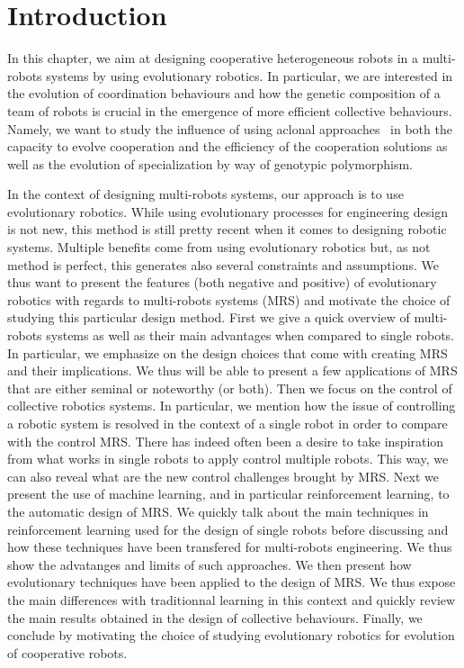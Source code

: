 \section{Introduction}

  In this chapter, we aim at designing cooperative heterogeneous robots in a multi-robots systems by using evolutionary robotics. In particular, we are interested in the evolution of coordination behaviours and how the genetic composition of a team of robots is crucial in the emergence of more efficient collective behaviours. Namely, we want to study the influence of using aclonal approaches~\parencite{Quinn2001} in both the capacity to evolve cooperation and the efficiency of the cooperation solutions as well as the evolution of specialization by way of genotypic polymorphism.

  In the context of designing multi-robots systems, our approach is to use evolutionary robotics. While using evolutionary processes for engineering design is not new, this method is still pretty recent when it comes to designing robotic systems. Multiple benefits come from using evolutionary robotics but, as not method is perfect, this generates also several constraints and assumptions. We thus want to present the features (both negative and positive) of evolutionary robotics with regards to multi-robots systems (MRS) and motivate the choice of studying this particular design method. First we give a quick overview of multi-robots systems as well as their main advantages when compared to single robots. In particular, we emphasize on the design choices that come with creating MRS and their implications. We thus will be able to present a few applications of MRS that are either seminal or noteworthy (or both). Then we focus on the control of collective robotics systems. In particular, we mention how the issue of controlling a robotic system is resolved in the context of a single robot in order to compare with the control MRS. There has indeed often been a desire to take inspiration from what works in single robots to apply control multiple robots. This way, we can also reveal what are the new control challenges brought by MRS. Next we present the use of machine learning, and in particular reinforcement learning, to the automatic design of MRS. We quickly talk about the main techniques in reinforcement learning used for the design of single robots before discussing and how these techniques have been transfered for multi-robots engineering. We thus show the advatanges and limits of such approaches. We then present how evolutionary techniques have been applied to the design of MRS. We thus expose the main differences with traditionnal learning in this context and quickly review the main results obtained in the design of collective behaviours. Finally, we conclude by motivating the choice of studying evolutionary robotics for evolution of cooperative robots.


